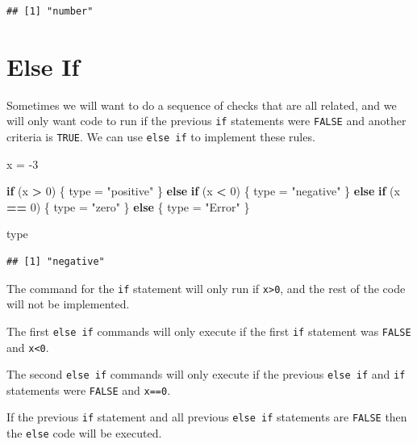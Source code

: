 \documentclass[
]{book}
\newenvironment{Shaded}{\begin{snugshade}}{\end{snugshade}}
\newcommand{\ControlFlowTok}[1]{\textcolor[rgb]{0.13,0.29,0.53}{\textbf{#1}}}
\newcommand{\DecValTok}[1]{\textcolor[rgb]{0.00,0.00,0.81}{#1}}
\newcommand{\NormalTok}[1]{#1}
\newcommand{\OperatorTok}[1]{\textcolor[rgb]{0.81,0.36,0.00}{\textbf{#1}}}
\newcommand{\StringTok}[1]{\textcolor[rgb]{0.31,0.60,0.02}{#1}}
\begin{document}
\begin{verbatim}
## [1] "number"
\end{verbatim}

\hypertarget{elseif}{%
\section{Else If}\label{elseif}}

Sometimes we will want to do a sequence of checks that are all related, and we will only want code to run if the previous \texttt{if} statements were \texttt{FALSE} and another criteria is \texttt{TRUE}. We can use \texttt{else\ if} to implement these rules.

\begin{Shaded}
\begin{Highlighting}[]
\NormalTok{x =}\StringTok{ }\DecValTok{-3}


\ControlFlowTok{if}\NormalTok{ (x }\OperatorTok{>}\StringTok{ }\DecValTok{0}\NormalTok{) \{}
\NormalTok{    type =}\StringTok{ "positive"}
\NormalTok{\} }\ControlFlowTok{else} \ControlFlowTok{if}\NormalTok{ (x }\OperatorTok{<}\StringTok{ }\DecValTok{0}\NormalTok{) \{}
\NormalTok{    type =}\StringTok{ "negative"}
\NormalTok{\} }\ControlFlowTok{else} \ControlFlowTok{if}\NormalTok{ (x }\OperatorTok{==}\StringTok{ }\DecValTok{0}\NormalTok{) \{}
\NormalTok{    type =}\StringTok{ "zero"}
\NormalTok{\} }\ControlFlowTok{else}\NormalTok{ \{}
\NormalTok{    type =}\StringTok{ "Error"}
\NormalTok{\}}

\NormalTok{type}
\end{Highlighting}
\end{Shaded}

\begin{verbatim}
## [1] "negative"
\end{verbatim}

The command for the \texttt{if} statement will only run if \texttt{x\textgreater{}0}, and the rest of the code will not be implemented.

The first \texttt{else\ if} commands will only execute if the first \texttt{if} statement was \texttt{FALSE} and \texttt{x\textless{}0}.

The second \texttt{else\ if} commands will only execute if the previous \texttt{else\ if} and \texttt{if} statements were \texttt{FALSE} and \texttt{x==0}.

If the previous \texttt{if} statement and all previous \texttt{else\ if} statements are \texttt{FALSE} then the \texttt{else} code will be executed.
\end{document}
